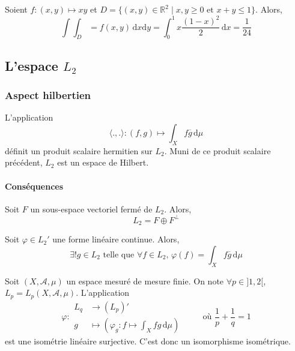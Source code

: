 
  \begin{example}
    Soient $f : (x,y) \mapsto xy$ et $D = \{ (x,y) \in \mathbb{R}^2 \mid x, y \geq 0 \text{ et } x + y \leq 1 \}$. Alors,
    \[ \int \int_D = f(x,y) \, \mathrm{d}x \mathrm{d}y = \int_0^1 x \frac{(1-x)^2}{2} \, \mathrm{d}x = \frac{1}{24} \]
  \end{example}

  \subsection{L'espace \texorpdfstring{$L_2$}{L₂}}

  \subsubsection{Aspect hilbertien}


  \begin{definition}
    L'application
    \[ \langle ., . \rangle : (f,g) \mapsto \int_X f \overline{g} \, \mathrm{d}\mu \]
    définit un produit scalaire hermitien sur $L_2$. Muni de ce produit scalaire précédent, $L_2$ est un espace de Hilbert.
  \end{definition}

  \paragraph{Conséquences}

  \begin{theorem}
    Soit $F$ un sous-espace vectoriel fermé de $L_2$. Alors,
    \[ L_2 = F \oplus F^\perp \]
  \end{theorem}

  \begin{corollary}
    Soit $\varphi \in L_2'$ une forme linéaire continue. Alors,
    \[ \exists! g \in L_2 \text{ telle que } \forall f \in L_2, \, \varphi(f) = \int_X f \overline{g} \, \mathrm{d}\mu \]
  \end{corollary}


  \begin{application}[Dual de $L_p$]
    Soit $(X, \mathcal{A}, \mu)$ un espace mesuré de mesure finie. On note $\forall p \in ]1,2[$, $L_p = L_p(X, \mathcal{A}, \mu)$. L'application
    \[
    \varphi :
    \begin{array}{ll}
      L_q &\rightarrow (L_p)' \\
      g &\mapsto \left( \varphi_g : f \mapsto \int_X f g \, \mathrm{d}\mu \right)
    \end{array}
    \qquad \text{ où } \frac{1}{p} + \frac{1}{q} = 1
    \]
    est une isométrie linéaire surjective. C'est donc un isomorphisme isométrique.
  \end{application}

